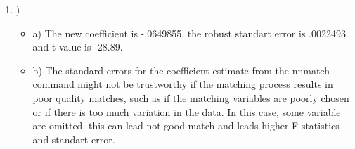 \documentclass{article}
\begin{document}
\begin{enumerate}
\begin{itemize}
\end {itemize}


\item )

\begin{itemize}

\item a) The new coefficient is -.0649855, the robust standart error is .0022493 and t value is -28.89.
 
\vspace{0.5cm}

\item b) The standard errors for the coefficient estimate from the nnmatch command might not be trustworthy if the matching process results in poor quality matches, such as if the matching variables are poorly chosen or if there is too much variation in the data. In this case, some variable are omitted. this can lead not good match and leads higher F statistics and standart error.

\end {itemize}
\end {enumerate}
\end{document}
